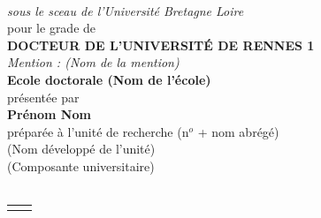 \documentclass[10pt]{book}
\begin{document}
\begin{titlepage}
\begin{center}
\begin{minipage}{\glarg}
\vspace{0.5cm}
\\ \vspace{0mm}\emph{\Large sous le sceau de l'Universit\'e Bretagne Loire}\\ \vspace{0.5cm}
{\Large pour le grade de}\\ \vspace{2mm}
{\Large\bf DOCTEUR DE L'UNIVERSIT\'E DE RENNES 1}\\ \vspace{0.4cm}
\emph{\Large Mention : (Nom de la mention)}\\ \vspace{2mm}
{\Large\bf Ecole doctorale (Nom de l'\'ecole)}\\ \vspace{0.3cm}
{\Large pr\'esent\'ee par} \\ \vspace{3mm}
{\Huge\bf Pr\'enom Nom}\\ \vspace{0.4cm}
{\Large pr\'epar\'ee \`a l'unit\'e de recherche (n$^o$ + nom abr\'eg\'e)\\
(Nom d\'evelopp\'e de l'unit\'e)\\
(Composante universitaire)}\vspace{0.3cm}
\\
\hspace{-20mm}{\rule{\Glarg}{1pt}}\\
\vspace{8mm}

\begin{tabular}{p{7cm}p{10cm}}
\begin{minipage}{\plarg}
\vspace{-4cm}
\hspace{-1.8cm}{\huge\bf Intitul\'e de la th\`ese}\vspace{5mm}

\hspace{-1.8cm}{\huge\bf Ex.: Contribution}\vspace{5mm}

\hspace{-1.8cm}{\huge\bf \`a la conception}\vspace{5mm}

\hspace{-1.8cm}{\huge\bf \`a bas co\^ut}\vspace{5mm}


\end{minipage}
\end{tabular}
\end{minipage}
\end{center}
\end{titlepage}
\end{document}
